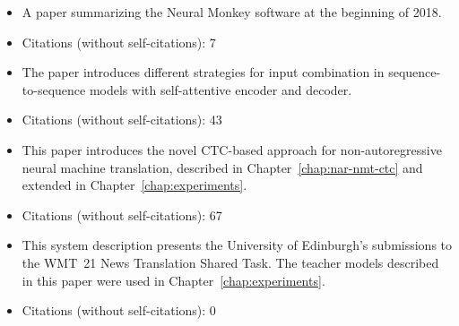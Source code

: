 \noindent{}
\begin{itemize}[noitemsep,topsep=0pt]

\item A paper summarizing the Neural Monkey software at the beginning of 2018.

\item Citations (without self-citations): 7
\end{itemize}\vspace{.5\baselineskip}

\noindent{}
\begin{itemize}[noitemsep,topsep=0pt]

\item The paper introduces different strategies for input combination in
  sequence-to-sequence models with self-attentive encoder and decoder.

\item Citations (without self-citations): 43
\end{itemize}\vspace{.5\baselineskip}

\noindent{}
\begin{itemize}[noitemsep,topsep=0pt]

\item This paper introduces the novel CTC-based approach for non-autoregressive
  neural machine translation, described in Chapter~\ref{chap:nar-nmt-ctc} and
  extended in Chapter~\ref{chap:experiments}.

\item Citations (without self-citations): 67
\end{itemize}\vspace{.5\baselineskip}

\noindent{}
\begin{itemize}[noitemsep,topsep=0pt]

\item This system description presents the University of Edinburgh's
  submissions to the WMT~21 News Translation Shared Task. The teacher models
  described in this paper were used in Chapter~\ref{chap:experiments}.

\item Citations (without self-citations): 0
\end{itemize}\vspace{.5\baselineskip}

